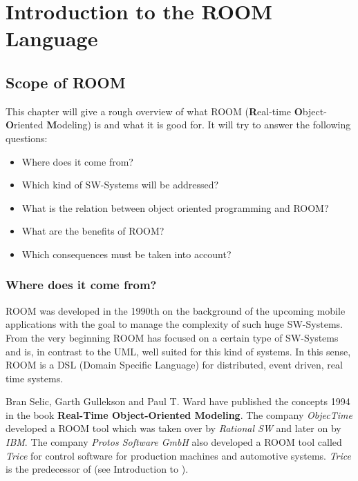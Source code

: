 \section{Introduction to the ROOM Language}

\subsection{Scope of ROOM}

This chapter will give a rough overview of what ROOM (\textbf{R}eal-time
\textbf{O}bject-\textbf{O}riented \textbf{M}odeling) is and what it is good for.
It will try to answer the following questions:

\begin{itemize}
\item Where does it come from?
\item Which kind of SW-Systems will be addressed?
\item What is the relation between object oriented programming and ROOM?
\item What are the benefits of ROOM?
\item Which consequences must be taken into account?
\end{itemize}

\subsubsection{Where does it come from?}

ROOM was developed in the 1990th on the background of the upcoming mobile applications with the goal to
manage the complexity of such huge SW-Systems. From the very beginning ROOM has focused on a certain type
of SW-Systems and is, in contrast to the UML, well suited for this kind of systems. In this sense, ROOM is
a DSL (Domain Specific Language) for distributed, event driven, real time systems. 

Bran Selic, Garth Gullekson and Paul T. Ward have published the concepts 1994 in the book
\textbf{Real-Time Object-Oriented Modeling}. The company \textit{ObjecTime}\texttrademark{}
developed a ROOM tool which was taken over by \textit{Rational SW}\texttrademark{} and later
on by \textit{IBM}\texttrademark.
The company \textit{Protos Software GmbH}\texttrademark{} also developed a ROOM tool called
\textit{Trice}\texttrademark{} for control software for production machines and automotive systems.
\textit{Trice}\texttrademark{} is the predecessor of \eTrice{} (see Introduction to \eTrice{}). 
 
